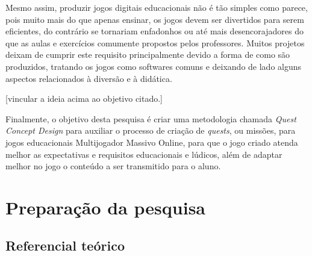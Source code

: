 \documentclass[
	12pt,				%
	openright,			%
	twoside,			%
	a4paper,			%
	english,			%
	french,				%
	spanish,			%
	brazil				%
	]{abntex2}
\begin{document}
Mesmo assim, produzir jogos digitais educacionais não é tão simples como parece, pois muito mais do que apenas ensinar, os jogos devem ser divertidos para serem eficientes, do contrário se tornariam enfadonhos ou até mais desencorajadores do que as aulas e exercícios comumente propostos pelos professores. Muitos projetos deixam de cumprir este requisito principalmente devido a forma de como são produzidos, tratando os jogos como softwares comuns e deixando de lado alguns aspectos relacionados à diversão e à didática.

[vincular a ideia acima ao objetivo citado.]

Finalmente, o objetivo desta pesquisa é criar uma metodologia chamada \emph{Quest Concept Design} para auxiliar o processo de criação de \emph{quests}, ou missões, para jogos educacionais Multijogador Massivo Online, para que o jogo criado atenda melhor as  expectativas e requisitos educacionais e lúdicos, além de adaptar melhor no jogo o conteúdo a ser transmitido para o aluno. 





 

\part{Preparação da pesquisa}

\chapter{Referencial teórico}\label{cap_exemplos}

\end{document}
